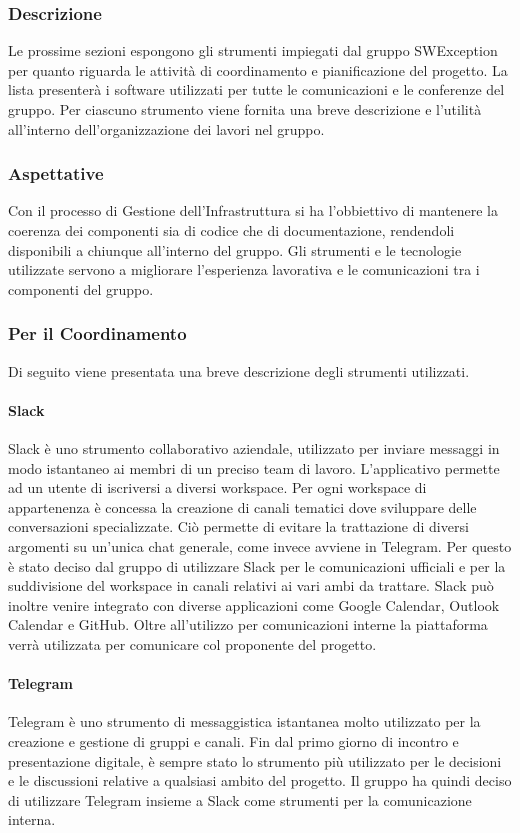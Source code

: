 \subsubsection{Descrizione}
Le prossime sezioni espongono gli strumenti impiegati dal gruppo SWException per quanto riguarda le attività di coordinamento e pianificazione del progetto. La lista presenterà i software utilizzati per tutte le comunicazioni e le conferenze del gruppo. Per ciascuno strumento viene fornita una breve descrizione e l'utilità all'interno dell'organizzazione dei lavori nel gruppo.

\subsubsection{Aspettative}
Con il processo di Gestione dell’Infrastruttura si ha l'obbiettivo di mantenere la coerenza dei componenti sia di codice che di documentazione, rendendoli disponibili a chiunque all'interno del gruppo. Gli strumenti e le tecnologie utilizzate servono a migliorare l'esperienza lavorativa e le comunicazioni tra i componenti del gruppo.


\subsubsection{Per il Coordinamento}
Di seguito viene presentata una breve descrizione degli strumenti utilizzati.

\paragraph{Slack}
Slack è uno strumento collaborativo aziendale, utilizzato per inviare messaggi in modo istantaneo ai membri di un preciso team di lavoro. L’applicativo permette ad un utente di iscriversi
a diversi workspace. Per ogni workspace di appartenenza è concessa la creazione di canali
tematici dove sviluppare delle conversazioni specializzate. Ciò permette di evitare la trattazione di diversi argomenti su un’unica chat generale, come invece avviene in Telegram. Per questo è stato deciso dal gruppo di utilizzare Slack per le comunicazioni ufficiali e per la suddivisione del workspace in canali relativi ai vari ambi da trattare. Slack può inoltre venire integrato con diverse applicazioni come Google Calendar, Outlook Calendar e GitHub. Oltre all'utilizzo per comunicazioni interne la piattaforma verrà utilizzata per comunicare col proponente del progetto.

\paragraph{Telegram}
Telegram è uno strumento di messaggistica istantanea molto utilizzato per la creazione e gestione di gruppi e canali. Fin dal primo giorno di incontro e presentazione digitale, è sempre stato lo strumento più utilizzato per le decisioni e le discussioni relative a qualsiasi ambito del progetto. Il gruppo ha quindi deciso di utilizzare Telegram insieme a Slack come strumenti per la comunicazione interna.

